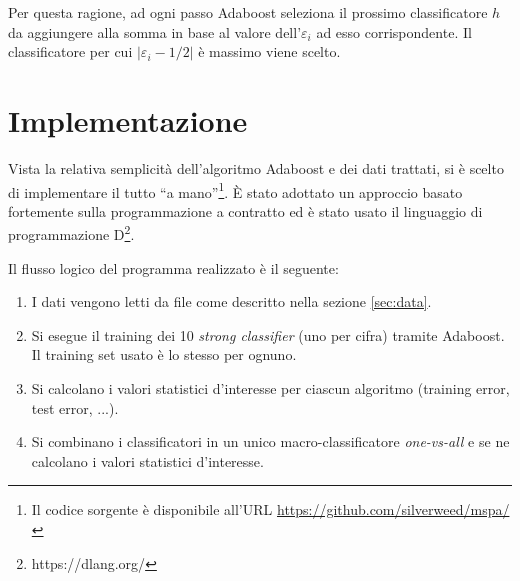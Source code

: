 \documentclass[12pt, letterpaper]{article}
\begin{document}
Per questa ragione, ad ogni passo Adaboost seleziona il prossimo classificatore $h$ da aggiungere alla somma in base al valore dell'$\varepsilon_i$ ad esso corrispondente. Il classificatore per cui \(|\varepsilon_i - 1/2|\) \`e massimo viene scelto.

\section{Implementazione}
Vista la relativa semplicit\`a dell'algoritmo Adaboost e dei dati trattati, si \`e scelto di implementare il tutto ``a mano''\footnote{Il codice sorgente \`e disponibile all'URL \url{https://github.com/silverweed/mspa/}}. \`E stato adottato un approccio basato fortemente sulla programmazione a contratto ed \`e stato usato il linguaggio di programmazione D\footnote{https://dlang.org/}.

Il flusso logico del programma realizzato \`e il seguente:
\begin{enumerate}
\item I dati vengono letti da file come descritto nella sezione \ref{sec:data}.
\item Si esegue il training dei 10 {\it strong classifier} (uno per cifra) tramite Adaboost. Il training set usato \`e lo stesso per ognuno.
\item Si calcolano i valori statistici d'interesse per ciascun algoritmo (training error, test error, ...).
\item Si combinano i classificatori in un unico macro-classificatore {\it one-vs-all} e se ne calcolano i valori statistici d'interesse.
\end{enumerate}
\end{document}
